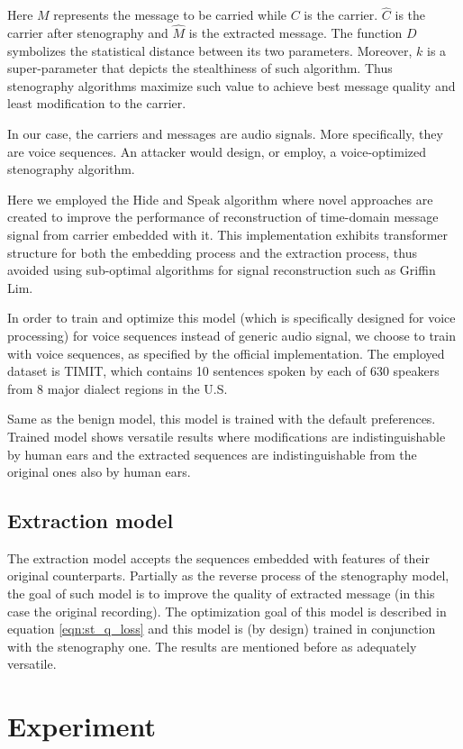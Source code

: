 \documentclass[journal]{IEEEtran} %
\begin{document}
Here $M$ represents the message to be carried while $C$ is the carrier. $\hat{C}$ is the carrier after stenography and $\hat{M}$ is the extracted message. The function $D$ symbolizes the statistical distance between its two parameters. Moreover, $k$ is a super-parameter that depicts the stealthiness of such algorithm. Thus stenography algorithms maximize such value to achieve best message quality and least modification to the carrier.

In our case, the carriers and messages are audio signals. More specifically, they are voice sequences. An attacker would design, or employ, a voice-optimized stenography algorithm. 

Here we employed the Hide and Speak algorithm where novel approaches are created to improve the performance of reconstruction of time-domain message signal from carrier embedded with it. This implementation exhibits transformer structure for both the embedding process and the extraction process, thus avoided using sub-optimal algorithms for signal reconstruction such as Griffin Lim.

In order to train and optimize this model (which is specifically designed for voice processing) for voice sequences instead of generic audio signal, we choose to train with voice sequences, as specified by the official implementation. The employed dataset is TIMIT, which contains 10 sentences spoken by each of 630 speakers from 8 major dialect regions in the U.S.

Same as the benign model, this model is trained with the default preferences. Trained model shows versatile results where modifications are indistinguishable by human ears and the extracted sequences are indistinguishable from the original ones also by human ears.

\subsection{Extraction model}

The extraction model accepts the sequences embedded with features of their original counterparts. Partially as the reverse process of the stenography model, the goal of such model is to improve the quality of extracted message (in this case the original recording). The optimization goal of this model is described in equation \ref{eqn:st_q_loss} and this model is (by design) trained in conjunction with the stenography one. The results are mentioned before as adequately versatile.

\section{Experiment}
\end{document}
